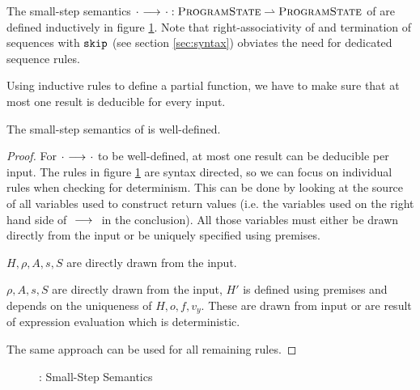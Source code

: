 The small-step semantics ${\cdot} \,\,{\longrightarrow^{}}\,\, {\cdot} : \textup{\textsc{ProgramState}} \rightharpoonup \textup{\textsc{ProgramState}}$ of \svlidf are defined inductively in figure \ref{fig:svl-sem-dyn-sstep}.
Note that right-associativity of \ttt{;} and termination of sequences with $\textup{\texttt{skip}}$ (see section \ref{sec:syntax}) obviates the need for dedicated sequence rules.

Using inductive rules to define a partial function, we have to make sure that at most one result is deducible for every input.
\begin{lemma}
    The small-step semantics of \svlidf is well-defined.
\end{lemma}
\begin{proof}
    For ${\cdot} \,\,{\longrightarrow^{}}\,\, {\cdot}$ to be well-defined, at most one result can be deducible per input.
    The rules in figure \ref{fig:svl-sem-dyn-sstep} are syntax directed, so we can focus on individual rules when checking for determinism.
    This can be done by looking at the source of all variables used to construct return values (i.e. the variables used on the right hand side of ${} \,\,{\longrightarrow^{}}\,\, {}$ in the conclusion).
    All those variables must either be drawn directly from the input or be uniquely specified using premises.
    
    $H, \rho, A, s, S$ are directly drawn from the input.
    
    $\rho, A, s, S$ are directly drawn from the input, $H'$ is defined using premises and depends on the uniqueness of $H, o, f, v_y$.
    These are drawn from input or are result of expression evaluation which is deterministic.
    
    The same approach can be used for all remaining rules.
\end{proof}

\begin{figure}
    \boxed{\sstep{\pi}{\pi}}
    
    \caption{\svlidf: Small-Step Semantics}
    \label{fig:svl-sem-dyn-sstep}
\end{figure}


